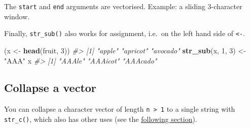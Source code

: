 \documentclass[
]{book}
\newenvironment{Shaded}{\begin{snugshade}}{\end{snugshade}}
\newcommand{\CommentTok}[1]{\textcolor[rgb]{0.56,0.35,0.01}{\textit{#1}}}
\newcommand{\DataTypeTok}[1]{\textcolor[rgb]{0.13,0.29,0.53}{#1}}
\newcommand{\DecValTok}[1]{\textcolor[rgb]{0.00,0.00,0.81}{#1}}
\newcommand{\KeywordTok}[1]{\textcolor[rgb]{0.13,0.29,0.53}{\textbf{#1}}}
\newcommand{\NormalTok}[1]{#1}
\newcommand{\OperatorTok}[1]{\textcolor[rgb]{0.81,0.36,0.00}{\textbf{#1}}}
\newcommand{\StringTok}[1]{\textcolor[rgb]{0.31,0.60,0.02}{#1}}
\begin{document}
The \texttt{start} and \texttt{end} arguments are vectorised. Example: a sliding 3-character window.

\begin{Shaded}
\end{Shaded}

Finally, \texttt{str\_sub()} also works for assignment, i.e.~on the left hand side of \texttt{\textless{}-}.

\begin{Shaded}
\begin{Highlighting}[]
\NormalTok{(x <-}\StringTok{ }\KeywordTok{head}\NormalTok{(fruit, }\DecValTok{3}\NormalTok{))}
\CommentTok{#> [1] "apple"   "apricot" "avocado"}
\KeywordTok{str_sub}\NormalTok{(x, }\DecValTok{1}\NormalTok{, }\DecValTok{3}\NormalTok{) <-}\StringTok{ "AAA"}
\NormalTok{x}
\CommentTok{#> [1] "AAAle"   "AAAicot" "AAAcado"}
\end{Highlighting}
\end{Shaded}

\hypertarget{collapse-a-vector}{%
\subsection{Collapse a vector}\label{collapse-a-vector}}

You can collapse a character vector of length \texttt{n\ \textgreater{}\ 1} to a single string with \texttt{str\_c()}, which also has other uses (see the \protect\hyperlink{catenate-vectors}{following section}).

\begin{Shaded}
\end{Shaded}
\end{document}
